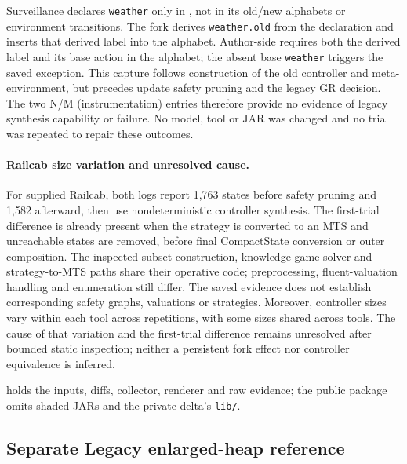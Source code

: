 \documentclass[11pt]{article}
\begin{document}
Surveillance declares \texttt{weather} only in , not in its old/new alphabets or environment transitions. The fork derives \texttt{weather.old} from the declaration and inserts that derived label into the alphabet. Author-side  requires both the derived label and its base action in the alphabet; the absent base \texttt{weather} triggers the saved exception. This capture follows construction of the old controller and meta-environment, but precedes update safety pruning and the legacy GR decision. The two N/M (instrumentation) entries therefore provide no evidence of legacy synthesis capability or failure. No model, tool or JAR was changed and no trial was repeated to repair these outcomes.

\paragraph{Railcab size variation and unresolved cause.}
For supplied Railcab, both logs report 1,763 states before safety pruning and 1,582 afterward, then use nondeterministic controller synthesis. The first-trial difference is already present when the strategy is converted to an MTS and unreachable states are removed, before final CompactState conversion or outer composition. The inspected subset construction, knowledge-game solver and strategy-to-MTS paths share their operative code; preprocessing, fluent-valuation handling and enumeration still differ. The saved evidence does not establish corresponding safety graphs, valuations or strategies. Moreover, controller sizes vary within each tool across repetitions, with some sizes shared across tools. The cause of that variation and the first-trial difference remains unresolved after bounded static inspection; neither a persistent fork effect nor controller equivalence is inferred.


 holds the inputs, diffs, collector, renderer and raw evidence; the public package omits shaded JARs and the private delta's \texttt{lib/}.

\clearpage
\subsection{Separate Legacy enlarged-heap reference}
\label{supp:vthree-ext-six}


\clearpage
\end{document}
